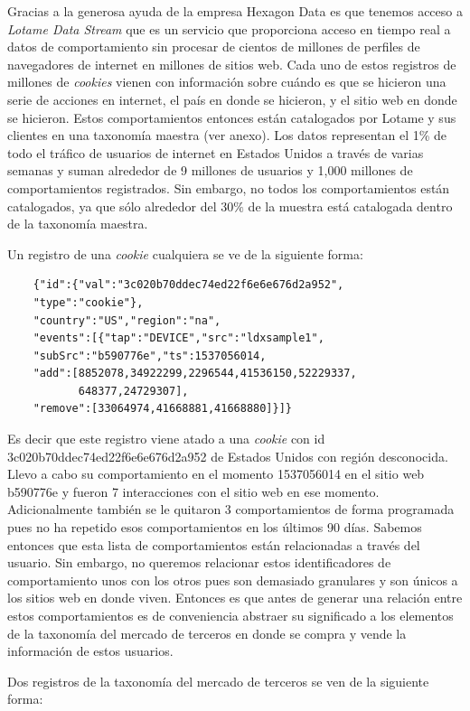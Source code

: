 Gracias a la generosa ayuda de la empresa Hexagon Data es que tenemos acceso a \textit{Lotame Data Stream} que es un servicio que proporciona acceso en tiempo real a datos de comportamiento sin procesar de cientos de millones de perfiles de navegadores de internet en millones de sitios web. Cada uno de estos registros de millones de \textit{cookies} vienen con información sobre cuándo es que se hicieron una serie de acciones en internet, el país en donde se hicieron, y el sitio web en donde se hicieron. Estos comportamientos entonces están catalogados por Lotame y sus clientes en una taxonomía maestra (ver anexo). Los datos representan el 1\% de todo el tráfico de usuarios de internet en Estados Unidos a través de varias semanas y suman alrededor de 9 millones de usuarios y 1,000 millones de comportamientos registrados. Sin embargo, no todos los comportamientos están catalogados, ya que sólo alrededor del 30$\%$ de la muestra está catalogada dentro de la taxonomía maestra. 

Un registro de una \textit{cookie} cualquiera se ve de la siguiente forma:
\begin{verbatim}
    {"id":{"val":"3c020b70ddec74ed22f6e6e676d2a952",
    "type":"cookie"},
    "country":"US","region":"na",
    "events":[{"tap":"DEVICE","src":"ldxsample1",
    "subSrc":"b590776e","ts":1537056014,
    "add":[8852078,34922299,2296544,41536150,52229337,
           648377,24729307],
    "remove":[33064974,41668881,41668880]}]}
\end{verbatim}

Es decir que este registro viene atado a una \textit{cookie} con id 3c020b70ddec74ed22f6e6e676d2a952 de Estados Unidos con región desconocida. Llevo a cabo su comportamiento en el momento 1537056014 en el sitio web b590776e y fueron 7 interacciones con el sitio web en ese momento. Adicionalmente también se le quitaron 3 comportamientos de forma programada pues no ha repetido esos comportamientos en los últimos 90 días. Sabemos entonces que esta lista de comportamientos están relacionadas a través del usuario. Sin embargo, no queremos relacionar estos identificadores de comportamiento unos con los otros pues son demasiado granulares y son únicos a los sitios web en donde viven. Entonces es que antes de generar una relación entre estos comportamientos es de conveniencia abstraer su significado a los elementos de la taxonomía del mercado de terceros en donde se compra y vende la información de estos usuarios.

Dos registros de la taxonomía del mercado de terceros se ven de la siguiente forma:

